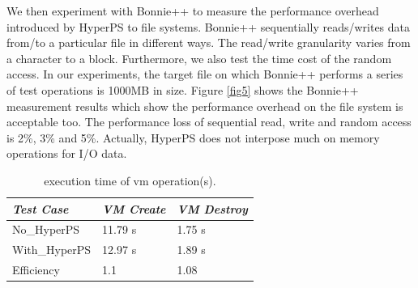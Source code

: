 We then experiment with Bonnie++ to measure the performance overhead introduced by HyperPS to file systems. 
Bonnie++ sequentially reads/writes data from/to a particular file in different ways. The read/write granularity varies from a character to a block. Furthermore, we also test the time cost of the random access. 
In our experiments, the target file on which Bonnie++ performs a series of test operations is 1000MB in size. 
Figure \ref{fig5} shows the Bonnie++ measurement results which show the performance overhead on the file system is acceptable too. 
The performance loss of sequential read, write and random access is 2\%, 3\% and 5\%. 
Actually, HyperPS does not interpose much on memory operations for I/O data. 

\begin{table}
\centering
\caption{execution time of vm operation(s).}\label{tabvm}
\begin{tabular}{p{2cm}|p{1.8cm}|p{2cm}}
\hline
{\itshape\bfseries  Test Case} & {\itshape\bfseries VM Create} & {\itshape\bfseries VM Destroy} \\
\hline
No\_HyperPS & 11.79 s &  1.75 s\\
\hline
With\_HyperPS & 12.97 s & 1.89 s\\ 
\hline
Efficiency & 1.1 & 1.08 \\
\hline
\end{tabular}
\end{table}


